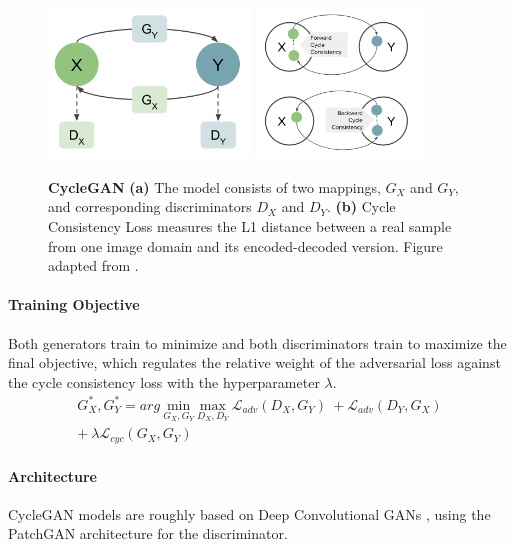 \documentclass[12pt]{report}
\begin{document}
\begin{figure}[t]
\centering
{}
{\includegraphics[height=4cm]{03_analysis/gans/cyclegan1}}\hspace{1cm}
{\includegraphics[height=4cm]{03_analysis/gans/cyclegan2}}
\caption{\label{fig:cyclegan} \textbf{CycleGAN} \textbf{(a)} The model consists of two mappings, $G_{X}$ and $G_{Y}$, and corresponding discriminators $D_{X}$ and $D_{Y}$. \textbf{(b)} Cycle Consistency Loss measures the L1 distance between a real sample from one image domain and its encoded-decoded version. Figure adapted from \cite{zhu_unpaired_2017}.}
\end{figure}


\paragraph{Training Objective}
Both generators train to minimize and both discriminators train to maximize the final objective, which regulates the relative weight of the adversarial loss against the cycle consistency loss with the hyperparameter $\lambda$.
\begin{equation}
\begin{split}
G^{*}_{X}, G^{*}_{Y} = arg \ \underset{G_{X}, G_{Y}}{\mathrm{min}} \ \underset{D_{X}, D_{Y}}{\mathrm{max}} \ \mathcal{L}_{adv}(D_{X},G_{Y}) \ +  \mathcal{L}_{adv}(D_{Y}, G_{X}) \\ + \ \lambda \mathcal{L}_{cyc}(G_{X}, G_{Y})
\end{split}
\end{equation}

\paragraph{Architecture}
CycleGAN models are roughly based on Deep Convolutional GANs \cite{radford_unsupervised_2015}, using the PatchGAN architecture \cite{isola_image--image_2016} for the discriminator.
\end{document}
